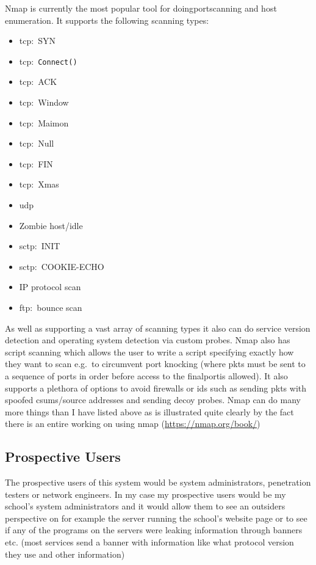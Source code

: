 \documentclass[titlepage]{article}
\let\Oldsubsection\subsection{}
\renewcommand{\subsection}{\FloatBarrier\Oldsubsection}
\begin{document}
Nmap is currently the most popular tool for doing\gls{port}scanning and host enumeration.
It supports the following scanning types:

\begin{itemize}
\item{\gls{tcp}:\ SYN}
\item{\gls{tcp}:\ \verb|Connect()|}
\item{\gls{tcp}:\ ACK}
\item{\gls{tcp}:\ Window}
\item{\gls{tcp}:\ Maimon}
\item{\gls{tcp}:\ Null}
\item{\gls{tcp}:\ FIN}
\item{\gls{tcp}:\ Xmas}
\item{\gls{udp}}
\item{Zombie host/idle}
\item{\gls{sctp}:\ INIT}
\item{\gls{sctp}:\ COOKIE-ECHO}
\item{IP protocol scan}
\item{\gls{ftp}:\ bounce scan}
\end{itemize}

As well as supporting a vast array of scanning types it also can do \gls{service} version detection
and operating system detection via custom probes. Nmap also has script scanning which allows
the user to write a script specifying exactly how they want to scan e.g.\ to circumvent \gls{port knocking}
(where \glspl{pkt} must be sent to a sequence of \glspl{port} in order before access to the final\gls{port}is allowed).
It also supports a plethora of options to avoid firewalls or \gls{ids} such as sending
\glspl{pkt} with spoofed \glspl{csum}/source addresses and sending decoy probes. Nmap can do many more things than I
have listed above as is illustrated quite clearly by the fact there is an entire working on using nmap
(\href{https://nmap.org/book/}{https://nmap.org/book/})

\subsection{Prospective Users}

The prospective users of this system would be system administrators, penetration testers or network engineers.
In my case my prospective users would be my school's system administrators and it would allow them to see an
outsiders perspective on for example the \gls{server} running the school's website page or to see if any of the
programs on the \glspl{server} were leaking information through \glspl{banner} etc. (most \glspl{service} send a \gls{banner} with
information like what protocol version they use and other information)
\end{document}
